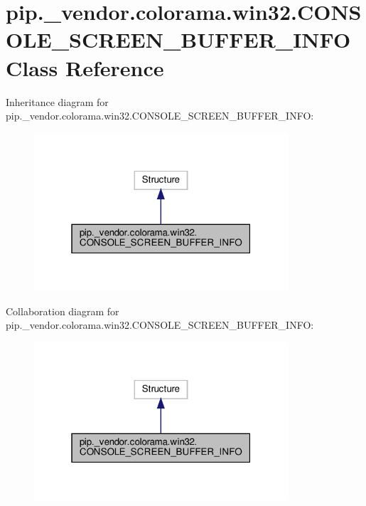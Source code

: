 \hypertarget{classpip_1_1__vendor_1_1colorama_1_1win32_1_1CONSOLE__SCREEN__BUFFER__INFO}{}\section{pip.\+\_\+vendor.\+colorama.\+win32.\+C\+O\+N\+S\+O\+L\+E\+\_\+\+S\+C\+R\+E\+E\+N\+\_\+\+B\+U\+F\+F\+E\+R\+\_\+\+I\+N\+FO Class Reference}
\label{classpip_1_1__vendor_1_1colorama_1_1win32_1_1CONSOLE__SCREEN__BUFFER__INFO}


Inheritance diagram for pip.\+\_\+vendor.\+colorama.\+win32.\+C\+O\+N\+S\+O\+L\+E\+\_\+\+S\+C\+R\+E\+E\+N\+\_\+\+B\+U\+F\+F\+E\+R\+\_\+\+I\+N\+FO\+:
\nopagebreak
\begin{figure}[H]
\begin{center}
\leavevmode
\includegraphics[width=268pt]{classpip_1_1__vendor_1_1colorama_1_1win32_1_1CONSOLE__SCREEN__BUFFER__INFO__inherit__graph}
\end{center}
\end{figure}


Collaboration diagram for pip.\+\_\+vendor.\+colorama.\+win32.\+C\+O\+N\+S\+O\+L\+E\+\_\+\+S\+C\+R\+E\+E\+N\+\_\+\+B\+U\+F\+F\+E\+R\+\_\+\+I\+N\+FO\+:
\nopagebreak
\begin{figure}[H]
\begin{center}
\leavevmode
\includegraphics[width=268pt]{classpip_1_1__vendor_1_1colorama_1_1win32_1_1CONSOLE__SCREEN__BUFFER__INFO__coll__graph}
\end{center}
\end{figure}

